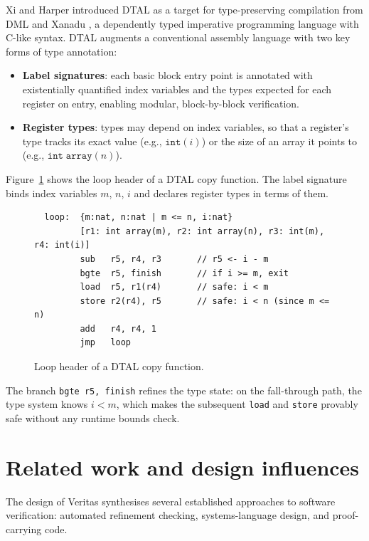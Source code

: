 Xi and Harper introduced DTAL as a target for type-preserving compilation from DML \cite{Xi1999DML} and Xanadu \cite{Xi2000Xanadu}, a dependently typed imperative programming language with C-like syntax. DTAL augments a conventional assembly language with two key forms of type annotation:
\begin{itemize}
  \item \textbf{Label signatures}: each basic block entry point is annotated with existentially quantified index variables and the types expected for each register on entry, enabling modular, block-by-block verification.
  \item \textbf{Register types}: types may depend on index variables, so that a register's type tracks its exact value (e.g., $\mathtt{int}(i)$) or the size of an array it points to (e.g., $\mathtt{int\;array}(n)$).
\end{itemize}

Figure~\ref{fig:copy-loop} shows the loop header of a DTAL copy function. The label signature binds index variables $m$, $n$, $i$ and declares register types in terms of them.

\begin{figure}[h]
  \begin{verbatim}
  loop:  {m:nat, n:nat | m <= n, i:nat}
         [r1: int array(m), r2: int array(n), r3: int(m), r4: int(i)]
         sub   r5, r4, r3       // r5 <- i - m
         bgte  r5, finish       // if i >= m, exit
         load  r5, r1(r4)       // safe: i < m
         store r2(r4), r5       // safe: i < n (since m <= n)
         add   r4, r4, 1
         jmp   loop
\end{verbatim}
  \caption{Loop header of a DTAL copy function.}
  \label{fig:copy-loop}
\end{figure}

The branch \texttt{bgte r5, finish} refines the type state: on the fall-through path, the type system knows $i < m$, which makes the subsequent \texttt{load} and \texttt{store} provably safe without any runtime bounds check.

\section{Related work and design influences}
\label{sec:related-work}

The design of Veritas synthesises several established approaches to software verification: automated refinement checking, systems-language design, and proof-carrying code.

